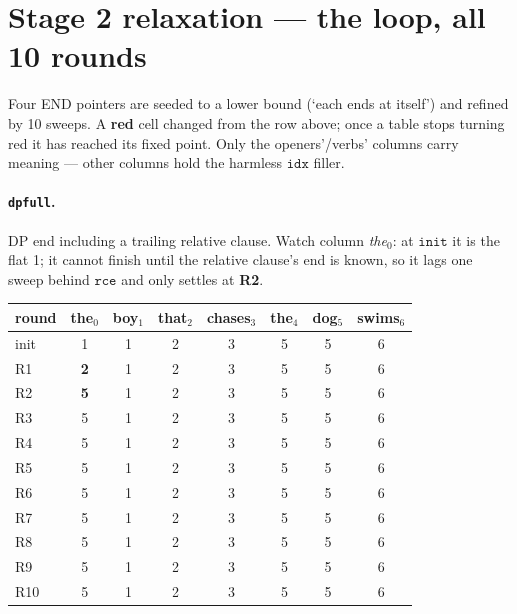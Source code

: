 \documentclass[10pt]{article}
\begin{document}
\section{Stage 2 relaxation --- the loop, all 10 rounds}
Four END pointers are seeded to a lower bound (`each ends at itself') and refined by 10 sweeps. A \textcolor{chg}{\textbf{red}} cell changed from the row above; once a table stops turning red it has reached its fixed point. Only the openers'/verbs' columns carry meaning --- other columns hold the harmless $\texttt{idx}$ filler.
\paragraph{\texttt{dpfull}.} DP end including a trailing relative clause. Watch column \emph{the}$_0$: at $\texttt{init}$ it is the flat 1; it cannot finish until the relative clause's end is known, so it lags one sweep behind $\texttt{rce}$ and only settles at \textbf{R2}.
\begin{center}\footnotesize\setlength{\tabcolsep}{4pt}\renewcommand{\arraystretch}{1.1}
\begin{tabular}{@{}l|ccccccc@{}}
\toprule \textbf{round} & the$_{0}$ & boy$_{1}$ & that$_{2}$ & chases$_{3}$ & the$_{4}$ & dog$_{5}$ & swims$_{6}$ \\ \midrule
init & 1 & 1 & 2 & 3 & 5 & 5 & 6 \\
R1 & \textcolor{chg}{\textbf{2}} & 1 & 2 & 3 & 5 & 5 & 6 \\
R2 & \textcolor{chg}{\textbf{5}} & 1 & 2 & 3 & 5 & 5 & 6 \\
R3 & 5 & 1 & 2 & 3 & 5 & 5 & 6 \\
R4 & 5 & 1 & 2 & 3 & 5 & 5 & 6 \\
R5 & 5 & 1 & 2 & 3 & 5 & 5 & 6 \\
R6 & 5 & 1 & 2 & 3 & 5 & 5 & 6 \\
R7 & 5 & 1 & 2 & 3 & 5 & 5 & 6 \\
R8 & 5 & 1 & 2 & 3 & 5 & 5 & 6 \\
R9 & 5 & 1 & 2 & 3 & 5 & 5 & 6 \\
R10 & 5 & 1 & 2 & 3 & 5 & 5 & 6 \\
\bottomrule\end{tabular}\end{center}
\end{document}
